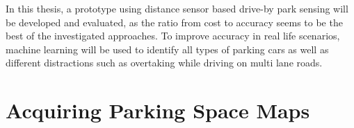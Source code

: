 \begin{table}

\caption{Machine learning models used to detect a city's parking space availability.}
\label{table:comparison_ml_approaches}
\end{table}


In this thesis, a prototype using distance sensor based drive-by park sensing will be developed and evaluated, as the ratio from cost to accuracy seems to be the best of the investigated approaches. To improve accuracy in real life scenarios, machine learning will be used to identify all types of parking cars as well as different distractions such as overtaking while driving on multi lane roads. 



\section{Acquiring Parking Space Maps}
\label{sec:acquiring_parking_space_maps}

